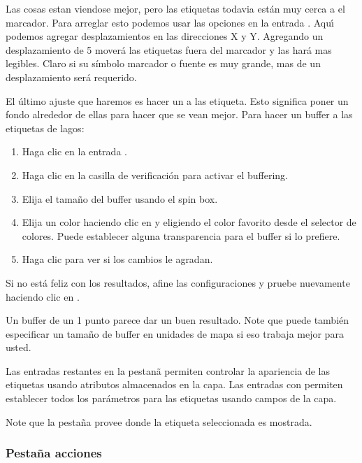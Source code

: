 Las cosas estan viendose mejor, pero las etiquetas todavia est\'an muy cerca a el marcador. Para
arreglar esto podemos usar las opciones en la entrada . Aqu\'{\i} podemos agregar 
desplazamientos en las direcciones X y Y. Agregando un desplazamiento de 5 mover\'a las etiquetas
fuera del marcador y las har\'a mas legibles. Claro si su s\'{i}mbolo marcador
o fuente es muy grande, mas de un desplazamiento ser\'a requerido.

El \'ultimo ajuste que haremos es hacer un  a las etiqueta. Esto significa
poner un fondo alrededor de ellas para hacer que se vean mejor. Para hacer un buffer a las
etiquetas de lagos:

\begin{enumerate}
\item Haga clic en la entrada .
\item Haga clic en la casilla de verificaci\'on   para activar el buffering.
\item Elija el tama\~no del buffer usando el spin box.
\item Elija un color haciendo clic en  y eligiendo el color favorito
  desde el selector de colores. Puede establecer alguna transparencia para el buffer
  si lo prefiere.
\item Haga clic  para ver si los cambios le agradan.
\end{enumerate} 

Si no est\'a feliz con los resultados, afine las configuraciones y pruebe nuevamente
haciendo clic en .

Un buffer de un 1 punto parece dar un buen resultado.
Note que puede también especificar un tama\~no de buffer en unidades de mapa si eso trabaja mejor
para usted.

Las entradas restantes en la pestan\~a  permiten controlar la apariencia de las
etiquetas usando atributos almacenados en la capa. Las entradas con  permiten establecer
todos los par\'ametros para las etiquetas usando campos de la capa.

Note que la pesta\~na  provee  donde 
la etiqueta seleccionada es mostrada.

\subsubsection{Pesta\~na acciones}\label{label_actions}

